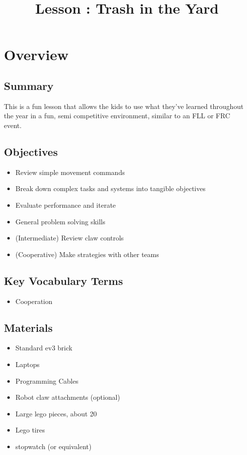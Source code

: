 \documentclass{lessonplan}
\title{Lesson \lessonNumber: Trash in the Yard}
\author{\linkHome}
\date{}
\begin{document}
  \maketitle

  \section{Overview}
    \subsection{Summary}
      This is a fun lesson that allows the kids to use what they've
      learned throughout the year in a fun, semi competitive
      environment, similar to an FLL or FRC event.
    \subsection{Objectives}
    \begin{itemize}
      \item Review simple movement commands
      \item Break down complex tasks and systems into tangible
        objectives
      \item Evaluate performance and iterate
      \item General problem solving skills
      \item (Intermediate) Review claw controls
      \item (Cooperative) Make strategies with other teams
    \end{itemize}
    \subsection{Key Vocabulary Terms}
    \begin{itemize}
      \item Cooperation
    \end{itemize}
    \subsection{Materials}
      \begin{itemize}
        \item Standard ev3 brick
        \item Laptops
        \item Programming Cables
        \item Robot claw attachments (optional)
        \item Large lego pieces, about 20
        \item Lego tires
        \item stopwatch (or equivalent)
      \end{itemize}
\end{document}
